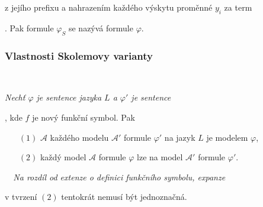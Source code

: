  z jejího prefixu a nahrazením každého výskytu proměnné $y_i$ za term
\smallskip

. Pak formule $\varphi_S$ se nazývá  formule $\varphi$.
\bigskip

{\it {}
\vspace{-2mm}

\vspace{-6mm}
\vspace{-2mm}

\vspace{-6mm}
}





\subsubsection*{Vlastnosti Skolemovy varianty}

{\bf {}}\ \ {\it Nechť $\varphi$ je sentence  jazyka $L$ a $\varphi'$ je sentence
\smallskip

 , kde $f$ je nový funkční symbol. Pak
\vspace{0.5mm}

\begin{enumerate}
\item[$(1)$]  $\mathcal{A}$ každého modelu $\mathcal{A'}$ formule $\varphi'$ na jazyk $L$ je modelem $\varphi$,
\vspace{0.5mm}

\item[$(2)$] každý model $\mathcal{A}$ formule $\varphi$ lze  na model $\mathcal{A}'$ formule $\varphi'$.
\end{enumerate}}
\smallskip

{\it {}\ \ Na rozdíl od extenze o definici funkčního symbolu, expanze
\smallskip

v tvrzení $(2)$ tentokrát nemusí být jednoznačná.}
\medskip

